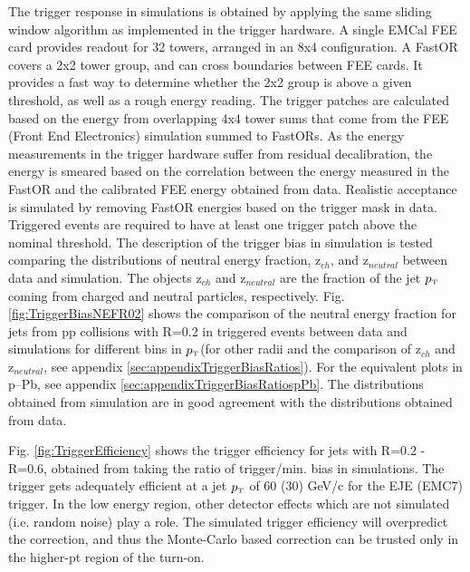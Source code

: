 \documentclass[ALICE]{ALICE_analysis_notes}
\newcommand{\pT}{$p_{\mbox{\tiny T}}$\xspace}
\newcommand{\pPb}{{\mbox{p--Pb}}\xspace}
\newcommand{\pp}{pp\xspace}
\begin{document}
The trigger response in simulations is obtained by applying the same sliding window algorithm as implemented in the trigger hardware. A single EMCal FEE card provides readout for 32 towers, arranged in an 8x4 configuration. A FastOR covers a 2x2 tower group, and can cross boundaries between FEE cards. It provides a fast way to determine whether the 2x2 group is above a given threshold, as well as a rough energy reading. The trigger patches are calculated based on the energy from overlapping 4x4 tower sums that come from the FEE (Front End Electronics) simulation summed to FastORs. As the energy measurements in the trigger hardware suffer from residual decalibration, the energy is smeared based on the correlation between the energy measured in the FastOR and the calibrated FEE energy obtained from data. Realistic acceptance is simulated by removing FastOR energies based on the trigger mask in data. Triggered events are required to have at least one trigger patch above the nominal threshold. The description of the trigger bias in simulation is tested comparing the distributions of neutral energy fraction, z$_{ch}$, and z$_{neutral}$ between data and simulation. The objects z$_{ch}$ and z$_{neutral}$ are the fraction of the jet \pT coming from charged and neutral particles, respectively. Fig. \ref{fig:TriggerBiasNEFR02} shows the comparison of the neutral energy fraction for jets from \pp collisions with R=0.2 in triggered events between data and simulations for different bins in \pT (for other radii and the comparison of z$_{ch}$ and z$_{neutral}$, see appendix \ref{sec:appendixTriggerBiasRatios}). For the equivalent plots in \pPb, see appendix \ref{sec:appendixTriggerBiasRatiospPb}. The distributions obtained from simulation are in good agreement with the distributions obtained from data. 

Fig. \ref{fig:TriggerEfficiency} shows the trigger efficiency for jets with R=0.2 - R=0.6, obtained from taking the ratio of trigger/min. bias in simulations. The trigger gets adequately efficient at a jet \pT of 60 (30) GeV/c for the EJE (EMC7) trigger. In the low energy region, other detector effects which are not simulated (i.e. random noise) play a role. The simulated trigger efficiency will overpredict the correction, and thus the Monte-Carlo based correction can be trusted only in the higher-pt region of the turn-on.
\end{document}
